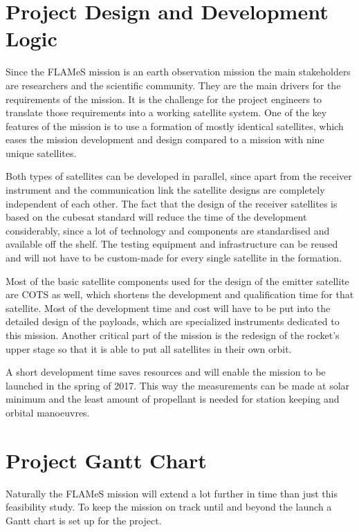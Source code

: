 \section{Project Design and Development Logic}
\label{frPMgantt}
Since the \ac{FLAMeS} mission is an earth observation mission the main stakeholders are researchers and the scientific community. They are the main drivers for the requirements of the mission. It is the challenge for the project engineers to translate those requirements into a working satellite system. One of the key features of the mission is to use a formation of mostly identical satellites, which eases the mission development and design compared to a mission with nine unique satellites. 

Both types of satellites can be developed in parallel, since apart from the receiver instrument and the communication link the satellite designs are completely independent of each other. The fact that the design of the receiver satellites is based on the cubesat standard will reduce the time of the development considerably, since a lot of technology and components are standardised and available off the shelf. The testing equipment and infrastructure can be reused and will not have to be custom-made for every single satellite in the formation. 

Most of the basic satellite components used for the design of the emitter satellite are \ac{COTS} as well, which shortens the development and qualification time for that satellite. Most of the development time and cost will have to be put into the detailed design of the payloads, which are specialized instruments dedicated to this mission. Another critical part of the mission is the redesign of the rocket's upper stage so that it is able to put all satellites in their own orbit.

A short development time saves resources and will enable the mission to be launched in the spring of 2017. This way the measurements can be made at solar minimum and the least amount of propellant is needed for station keeping and orbital manoeuvres.

\section{Project Gantt Chart}
Naturally the \ac{FLAMeS} mission will extend a lot further in time than just this feasibility study. To keep the mission on track until and beyond the launch a Gantt chart is set up for the project.

